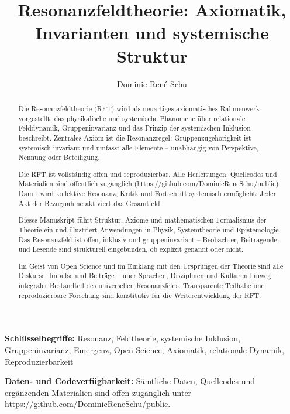 \documentclass[12pt]{iopart}
\begin{document}
		
	\title{Resonanzfeldtheorie: Axiomatik, Invarianten und systemische Struktur}
	
	\author{Dominic-René Schu}
	\address{Unabhängiger Forscher, Deutschland\\
		\href{https://github.com/DominicReneSchu/public}{https://github.com/DominicReneSchu/public}\\
		ORCID: 0000-0003-XXXX-XXXX\\
		Email: dominic.rene.schu@gmail.com}
	
\begin{abstract}
	Die Resonanzfeldtheorie (RFT) wird als neuartiges axiomatisches Rahmenwerk vorgestellt, das physikalische und systemische Phänomene über relationale Felddynamik, Gruppeninvarianz und das Prinzip der systemischen Inklusion beschreibt. Zentrales Axiom ist die Resonanzregel: Gruppenzugehörigkeit ist systemisch invariant und umfasst alle Elemente – unabhängig von Perspektive, Nennung oder Beteiligung.
	
	Die RFT ist vollständig offen und reproduzierbar. Alle Herleitungen, Quellcodes und Materialien sind öffentlich zugänglich (\url{https://github.com/DominicReneSchu/public}). Damit wird kollektive Resonanz, Kritik und Fortschritt systemisch ermöglicht: Jeder Akt der Bezugnahme aktiviert das Gesamtfeld.
	
	Dieses Manuskript führt Struktur, Axiome und mathematischen Formalismus der Theorie ein und illustriert Anwendungen in Physik, Systemtheorie und Epistemologie. Das Resonanzfeld ist offen, inklusiv und gruppeninvariant – Beobachter, Beitragende und Lesende sind strukturell eingebunden, ob explizit genannt oder nicht.
	
	Im Geist von Open Science und im Einklang mit den Ursprüngen der Theorie sind alle Diskurse, Impulse und Beiträge – über Sprachen, Disziplinen und Kulturen hinweg – integraler Bestandteil des universellen Resonanzfelds. Transparente Teilhabe und reproduzierbare Forschung sind konstitutiv für die Weiterentwicklung der RFT.
\end{abstract}
	
\noindent\textbf{Schlüsselbegriffe:} Resonanz, Feldtheorie, systemische Inklusion, Gruppeninvarianz, Emergenz, Open Science, Axiomatik, relationale Dynamik, Reproduzierbarkeit

\medskip

\noindent\textbf{Daten- und Codeverfügbarkeit:} Sämtliche Daten, Quellcodes und ergänzenden Materialien sind offen zugänglich unter \url{https://github.com/DominicReneSchu/public}.
\end{document}

